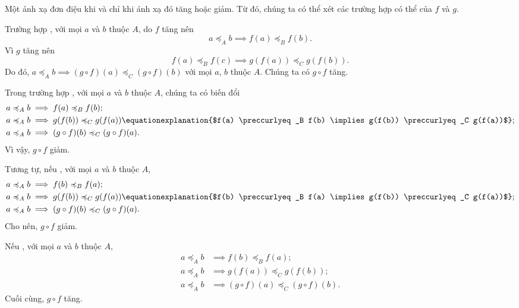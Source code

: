\solution 

\resetSubexercise Một ánh xạ đơn điệu khi và chỉ khi ánh xạ đó tăng hoặc giảm. Từ đó, chúng ta có thể xét các trường hợp có thể của $f$ và $g$.

Trường hợp , với mọi $a$ và $b$ thuộc $A$, do $f$ tăng nên \begin{equation*}
   a \preccurlyeq_A b \implies f(a) \preccurlyeq_B f(b).
\end{equation*}
Vì $g$ tăng nên 
\begin{equation*}
   f(a) \preccurlyeq_B f(c) \implies g(f(a)) \preccurlyeq_C g(f(b)).
\end{equation*}
Do đó, $a \preccurlyeq_A b \implies (g \circ f)(a) \preccurlyeq_C (g \circ f)(b)$ với mọi $a$, $b$ thuộc $A$. Chúng ta có $g \circ f$ tăng.

Trong trường hợp , với mọi $a$ và $b$ thuộc $A$, chúng ta có biến đổi 
\begin{align*}
   a \preccurlyeq_A b &\implies f(a) \preccurlyeq_B f(b); \\
   a \preccurlyeq_A b &\implies g(f(b)) \preccurlyeq_C g(f(a)) \equationexplanation{$f(a) \preccurlyeq_B f(b) \implies g(f(b)) \preccurlyeq_C g(f(a))$};\\
   a \preccurlyeq_A b &\implies (g \circ f)(b) \preccurlyeq_C (g \circ f)(a).
\end{align*}
Vì vậy, $g \circ f$ giảm.

Tương tự, nếu , với mọi $a$ và $b$ thuộc $A$,
\begin{align*}
   a \preccurlyeq_A b &\implies f(b) \preccurlyeq_B f(a);\\
   a \preccurlyeq_A b &\implies g(f(b)) \preccurlyeq_C g(f(a)) \equationexplanation{$f(b) \preccurlyeq_B f(a) \implies g(f(b)) \preccurlyeq_C g(f(a))$};\\
   a \preccurlyeq_A b &\implies (g \circ f)(b) \preccurlyeq_C (g \circ f)(a).
\end{align*}
Cho nên, $g \circ f$ giảm.

Nếu , với mọi $a$ và $b$ thuộc $A$,
\begin{align*}
   a \preccurlyeq_A b &\implies f(b) \preccurlyeq_B f(a);\\
   a \preccurlyeq_A b &\implies g(f(a)) \preccurlyeq_C g(f(b));\\
   a \preccurlyeq_A b &\implies (g \circ f)(a) \preccurlyeq_C (g \circ f)(b).
\end{align*}
Cuối cùng, $g \circ f$ tăng.

